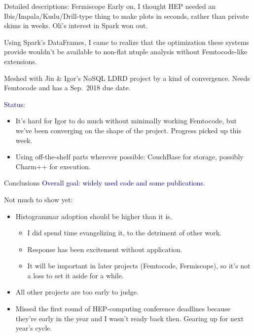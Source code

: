 \documentclass{beamer}
\begin{document}
\begin{frame}{Detailed descriptions: Fermiscope}
\vspace{0.4 cm}
Early on, I thought HEP needed an Ibis/Impala/Kudu/Drill-type thing to make plots in seconds, rather than private skims in weeks. Oli's interest in Spark won out.

\vspace{0.3 cm}
Using Spark's DataFrames, I came to realize that the optimization these systems provide wouldn't be available to non-flat ntuple analysis without Femtocode-like extensions.

\vspace{0.3 cm}
Meshed with Jin \& Igor's NoSQL LDRD project by a kind of convergence. Needs Femtocode and has a Sep.\ 2018 due date.

\vspace{0.4 cm}
\textcolor{darkblue}{Status:}
\begin{itemize}
\item It's hard for Igor to do much without minimally working Femtocode, but we've been converging on the shape of the project. Progress picked up this week.
\item Using off-the-shelf parts wherever possible: CouchBase for storage, possibly Charm++ for execution.
\end{itemize}
\end{frame}

\begin{frame}{Conclusions}
\textcolor{darkblue}{Overall goal: widely used code and some publications.}

\vspace{0.25 cm}
Not much to show yet:

\begin{itemize}
\item Histogrammar adoption should be higher than it is.
\begin{itemize}
\item I did spend time evangelizing it, to the detriment of other work.
\item Response has been excitement without application.
\item It will be important in later projects (Femtocode, Fermiscope), so it's not a loss to set it aside for a while.
\end{itemize}

\item All other projects are too early to judge.

\item Missed the first round of HEP-computing conference deadlines because they're early in the year and I wasn't ready back then. Gearing up for next year's cycle.
\end{itemize}
\end{frame}
\end{document}
